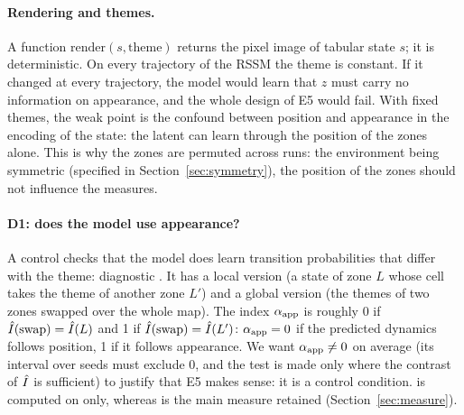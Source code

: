 \documentclass[10pt]{article}
\begin{document}
\paragraph{Rendering and themes.}
A function $\mathrm{render}(s, \text{theme})$ returns the pixel image of tabular state $s$; it is deterministic.
On every trajectory of the RSSM the theme is constant.
If it changed at every trajectory, the model would learn that $z$ must carry no information on appearance, and the
whole design of E5 would fail.
With fixed themes, the weak point is the confound between position and appearance in the encoding of the state: the
latent can learn through the position of the zones alone.
This is why the zones are permuted across runs: the environment being symmetric (specified in
Section~\ref{sec:symmetry}), the position of the zones should not influence the measures.

\paragraph{D1: does the model use appearance?}
A control checks that the model does learn transition probabilities that differ with the theme: diagnostic \DOne.
It has a local version (a state of zone $L$ whose cell takes the theme of another zone $L'$) and a global version (the
themes of two zones swapped over the whole map).
The index $\alpha_{\mathrm{app}}$ is roughly 0 if $\hat{I}(\text{swap}) = \hat{I}(L)$ and 1 if $\hat{I}(\text{swap}) = \hat{I}(L')$: %
$\alpha_{\mathrm{app}} = 0$ if the predicted dynamics follows position, 1 if it follows appearance. %
We want $\alpha_{\mathrm{app}} \neq 0$ on average (its interval over seeds must exclude 0, and the test is made only where the %
contrast of $\hat{I}$ is sufficient) to justify that E5 makes sense: it is a control condition.
\DOne{} is computed on \Iz{} only, whereas \Is{} is the main measure retained (Section~\ref{sec:measure}).
\end{document}
